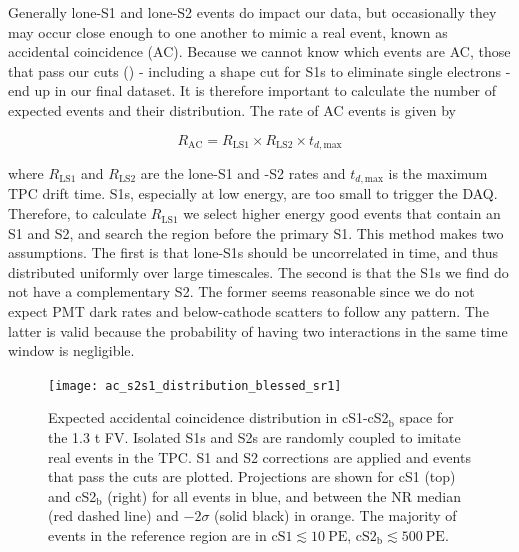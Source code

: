 Generally lone-S1 and lone-S2 events do impact our data, but occasionally they may occur close enough to one another to mimic a real
event, known as accidental coincidence (AC).  Because we cannot know which events are AC, those that pass our cuts 
() - including a shape cut for S1s to eliminate single electrons - end up
in our final dataset.  It is therefore important to calculate the number of expected events and their distribution.  The rate of AC events
is given by

\begin{equation}
R_{\mathrm{AC}} = R_{\mathrm{LS1}} \times R_{\mathrm{LS2}} \times t_{d, \mathrm{max}}
\label{eq:er_nr_calibrations_parameter_determ_additional_components_accidental_coincidence}
\end{equation}

\noindent where $R_{\mathrm{LS1}}$ and $R_{\mathrm{LS2}}$ are the lone-S1
and -S2 rates and $t_{d, \mathrm{max}}$ is the maximum TPC drift time.  S1s, especially at low energy, are too small to trigger the
DAQ.  Therefore, to calculate $R_{\mathrm{LS1}}$ we select higher energy good events that contain an S1 and S2, and search the region
before the primary S1.  This method makes two assumptions.  The first is that lone-S1s should be uncorrelated in time, and thus
distributed uniformly over large timescales.  The second is that the S1s we find do not have a complementary S2.  The former
seems reasonable since we do not expect PMT dark rates and below-cathode scatters to follow any pattern.  The latter is valid because
the probability of having two interactions in the same time window is negligible.

\begin{figure}
\centering
\texttt{[image: ac\_s2s1\_distribution\_blessed\_sr1]}
\caption[Expected accidental coincidence distribution in cS1-cS2$_{\mathrm{b}}$ space for the 1.3 t FV.  Isolated S1s and S2s are randomly
coupled to
imitate real events in the TPC.  S1 and S2 corrections are applied and events that pass the cuts are plotted.]{Expected accidental
coincidence distribution in cS1-cS2$_{\mathrm{b}}$ space for the 1.3 t FV.  Isolated S1s and S2s are randomly coupled to
imitate real events in the TPC.  S1 and S2 corrections are applied and events that pass the cuts are plotted.  Projections are
shown for cS1 (top) and cS2$_{\mathrm{b}}$ (right) for all events in blue, and between the NR median (red dashed line) and
$-2 \sigma$ (solid black) in orange.  The majority of events in the reference region are in $\mathrm{cS1} \lesssim 10\ \mathrm{PE}$,
$\mathrm{cS2_b} \lesssim 500\ \mathrm{PE}$.}
\label{fig:er_nr_calibrations_parameter_determ_ac}
\end{figure}

